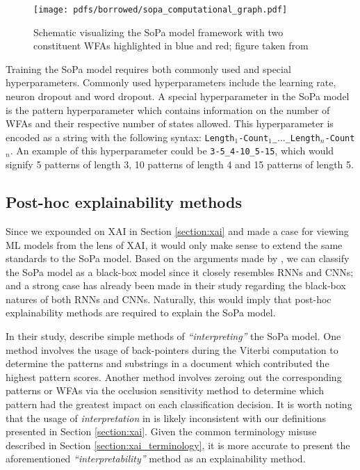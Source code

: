 \begin{figure}[t]
  \centering
  \texttt{[image: pdfs/borrowed/sopa\_computational\_graph.pdf]}
  \caption{Schematic visualizing the SoPa model framework with two constituent
    WFAs highlighted in blue and red; figure taken from
    \citet{schwartz2018sopa}}
  \label{fig:sopa}
\end{figure}

Training the SoPa model requires both commonly used and special hyperparameters.
Commonly used hyperparameters include the learning rate, neuron dropout and word
dropout. A special hyperparameter in the SoPa model is the pattern
hyperparameter which contains information on the number of WFAs and their
respective number of states allowed. This hyperparameter is encoded as a string
with the following syntax:
\texttt{Length$_{1}$-Count$_{1}$\_$\dots$\_Length$_{n}$-Count$_{n}$}. An example
of this hyperparameter could be \texttt{3-5\_4-10\_5-15}, which would signify 5
patterns of length 3, 10 patterns of length 4 and 15 patterns of length 5.

\subsection{Post-hoc explainability methods}

\label{section:sopa_explainability}

Since we expounded on XAI in Section \ref{section:xai} and made a case for
viewing ML models from the lens of XAI, it would only make sense to extend the
same standards to the SoPa model. Based on the arguments made by
\citet{arrieta2020explainable}, we can classify the SoPa model as a black-box
model since it closely resembles RNNs and CNNs; and a strong case has already
been made in their study regarding the black-box natures of both RNNs and CNNs.
Naturally, this would imply that post-hoc explainability methods are required to
explain the SoPa model.

In their study, \citet[Page 7, Section
7]{schwartz2018sopa} describe simple methods of \textit{``interpreting''} the
SoPa model. One method involves the usage of back-pointers during the Viterbi
computation to determine the patterns and substrings in a document which
contributed the highest pattern scores. Another method involves zeroing out the
corresponding patterns or WFAs via the occlusion sensitivity method to determine
which pattern had the greatest impact on each classification decision. It is
worth noting that the usage of \textit{interpretation} in
\citet{schwartz2018sopa} is likely inconsistent with our definitions presented
in Section \ref{section:xai}. Given the common terminology misuse described in
Section \ref{section:xai_terminology}, it is more accurate to present the
aforementioned \textit{``interpretability''} method as an explainability method.

